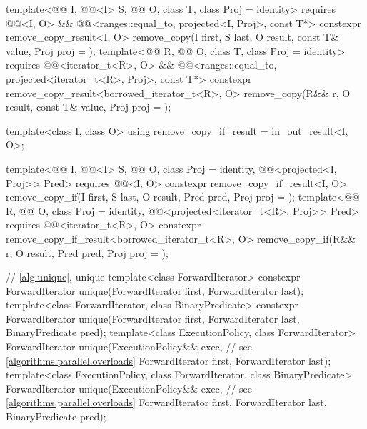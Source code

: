 \begin{codeblock}
{{    template<@@ I, @@<I> S, @@ O, class T,
             class Proj = identity>
      requires @@<I, O> &&
               @@<ranges::equal_to, projected<I, Proj>, const T*>
      constexpr remove_copy_result<I, O>
        remove_copy(I first, S last, O result, const T& value, Proj proj = {});
    template<@@ R, @@ O, class T, class Proj = identity>
      requires @@<iterator_t<R>, O> &&
               @@<ranges::equal_to,
                                         projected<iterator_t<R>, Proj>, const T*>
      constexpr remove_copy_result<borrowed_iterator_t<R>, O>
        remove_copy(R&& r, O result, const T& value, Proj proj = {});

    template<class I, class O>
      using remove_copy_if_result = in_out_result<I, O>;

    template<@@ I, @@<I> S, @@ O,
             class Proj = identity, @@<projected<I, Proj>> Pred>
      requires @@<I, O>
      constexpr remove_copy_if_result<I, O>
        remove_copy_if(I first, S last, O result, Pred pred, Proj proj = {});
    template<@@ R, @@ O, class Proj = identity,
             @@<projected<iterator_t<R>, Proj>> Pred>
      requires @@<iterator_t<R>, O>
      constexpr remove_copy_if_result<borrowed_iterator_t<R>, O>
        remove_copy_if(R&& r, O result, Pred pred, Proj proj = {});
  }

  // \ref{alg.unique}, unique
  template<class ForwardIterator>
    constexpr ForwardIterator unique(ForwardIterator first, ForwardIterator last);
  template<class ForwardIterator, class BinaryPredicate>
    constexpr ForwardIterator unique(ForwardIterator first, ForwardIterator last,
                                     BinaryPredicate pred);
  template<class ExecutionPolicy, class ForwardIterator>
    ForwardIterator unique(ExecutionPolicy&& exec,              // see \ref{algorithms.parallel.overloads}
                           ForwardIterator first, ForwardIterator last);
  template<class ExecutionPolicy, class ForwardIterator, class BinaryPredicate>
    ForwardIterator unique(ExecutionPolicy&& exec,              // see \ref{algorithms.parallel.overloads}
                           ForwardIterator first, ForwardIterator last,
                           BinaryPredicate pred);

}
\end{codeblock}
